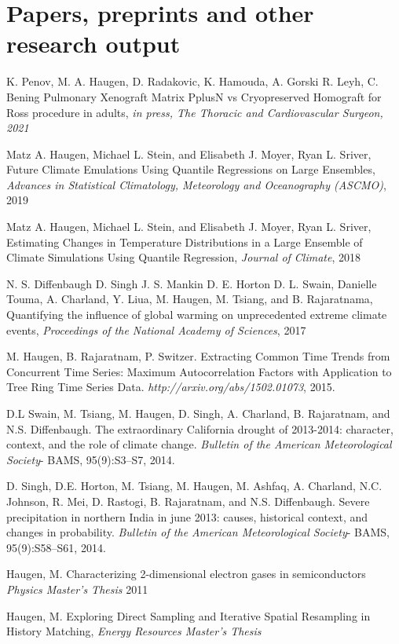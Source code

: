 \documentclass[letterpaper, 12pt]{article}
\renewenvironment{itemize}{
  \begin{list}{}{
    \setlength{\leftmargin}{1.5em}
  }
}{
  \end{list}
}
\begin{document}
\section*{Papers, preprints and other research output}
\begin{itemize}
  \item {K. Penov, M. A. Haugen, D. Radakovic, K. Hamouda, A. Gorski
R. Leyh, C. Bening} Pulmonary Xenograft Matrix PplusN vs Cryopreserved Homograft for Ross procedure in adults, \emph{in press, The Thoracic and Cardiovascular Surgeon, 2021}
  \item{Matz A. Haugen, Michael L. Stein, and Elisabeth J. Moyer, Ryan L. Sriver, Future Climate Emulations Using Quantile Regressions on Large Ensembles, \emph{Advances in Statistical Climatology, Meteorology and Oceanography (ASCMO)}, 2019}
  \item{Matz A. Haugen, Michael L. Stein, and Elisabeth J. Moyer, Ryan L. Sriver, Estimating Changes in Temperature Distributions in a Large Ensemble of Climate Simulations Using Quantile Regression, \emph{Journal of Climate}, 2018}
  \item N. S. Diffenbaugh D. Singh J. S. Mankin D. E. Horton D. L. Swain, Danielle Touma, A. Charland, Y. Liua, M. Haugen, M. Tsiang, and B. Rajaratnama, Quantifying the influence of global warming on unprecedented extreme climate events, \emph{Proceedings of the National Academy of Sciences}, 2017
\item M. Haugen, B. Rajaratnam, P. Switzer. Extracting Common Time
  Trends from Concurrent Time Series: Maximum Autocorrelation Factors
  with Application to Tree Ring Time Series Data. \emph{http://arxiv.org/abs/1502.01073}, 2015.
\item D.L Swain, M. Tsiang, M. Haugen, D. Singh, A. Charland, B. Rajaratnam, and N.S. Diffenbaugh.
The extraordinary California drought of 2013-2014: character, context, and the role of climate
change. \emph{Bulletin of the American Meteorological Society}- BAMS,
95(9):S3--S7, 2014.
\item D. Singh, D.E. Horton, M. Tsiang, M. Haugen, M. Ashfaq, A. Charland, N.C. Johnson, R. Mei, D. Rastogi,  B. Rajaratnam, and N.S. Diffenbaugh. Severe precipitation in northern India in june
2013: causes, historical context, and changes in probability. \emph{Bulletin of the American Meteorological
Society}- BAMS, 95(9):S58--S61, 2014.
\item Haugen, M. Characterizing 2-dimensional electron gases in semiconductors \emph{Physics Master's Thesis} 2011
\item Haugen, M. Exploring Direct Sampling and Iterative Spatial
Resampling in History Matching, \emph{Energy Resources Master's Thesis}
\end{itemize}
\end{document}
